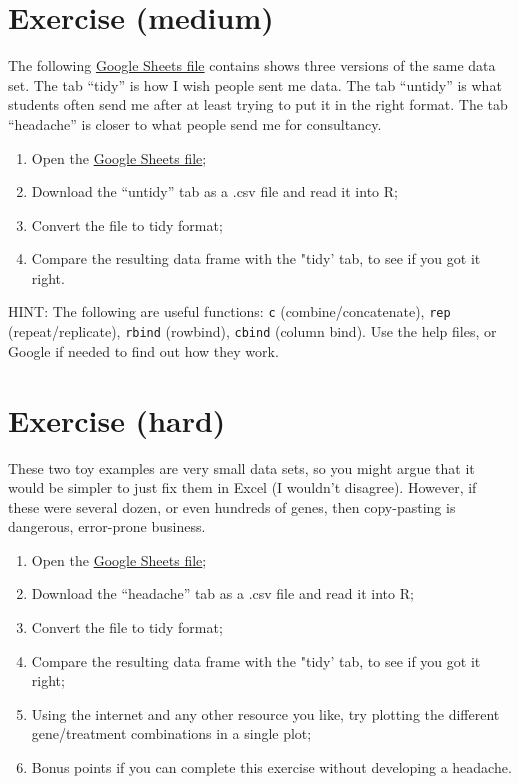 \documentclass[
]{book}
\providecommand{\tightlist}{%
  \setlength{\itemsep}{0pt}\setlength{\parskip}{0pt}}
\begin{document}
\hypertarget{exercise-medium-1}{%
\section{Exercise (medium)}\label{exercise-medium-1}}

The following \href{https://docs.google.com/spreadsheets/d/1zBw0JX1JqALqF7m1CLQp4ojd1LUDoYHxnc6xIUYQVYY/}{Google Sheets file} contains shows three versions of the same data set. The tab ``tidy'' is how I wish people sent me data. The tab ``untidy'' is what students often send me after at least trying to put it in the right format. The tab ``headache'' is closer to what people send me for consultancy.

\begin{enumerate}
\def\labelenumi{\arabic{enumi}.}
\tightlist
\item
  Open the \href{https://docs.google.com/spreadsheets/d/1zBw0JX1JqALqF7m1CLQp4ojd1LUDoYHxnc6xIUYQVYY/}{Google Sheets file};
\item
  Download the ``untidy'' tab as a .csv file and read it into R;
\item
  Convert the file to tidy format;
\item
  Compare the resulting data frame with the "tidy' tab, to see if you got it right.
\end{enumerate}

HINT: The following are useful functions: \texttt{c} (combine/concatenate), \texttt{rep} (repeat/replicate), \texttt{rbind} (rowbind), \texttt{cbind} (column bind). Use the help files, or Google if needed to find out how they work.

\hypertarget{exercise-hard-1}{%
\section{Exercise (hard)}\label{exercise-hard-1}}

These two toy examples are very small data sets, so you might argue that it would be simpler to just fix them in Excel (I wouldn't disagree). However, if these were several dozen, or even hundreds of genes, then copy-pasting is dangerous, error-prone business.

\begin{enumerate}
\def\labelenumi{\arabic{enumi}.}
\tightlist
\item
  Open the \href{https://docs.google.com/spreadsheets/d/1zBw0JX1JqALqF7m1CLQp4ojd1LUDoYHxnc6xIUYQVYY/}{Google Sheets file};
\item
  Download the ``headache'' tab as a .csv file and read it into R;
\item
  Convert the file to tidy format;
\item
  Compare the resulting data frame with the "tidy' tab, to see if you got it right;
\item
  Using the internet and any other resource you like, try plotting the different gene/treatment combinations in a single plot;
\item
  Bonus points if you can complete this exercise without developing a headache.
\end{enumerate}
\end{document}
